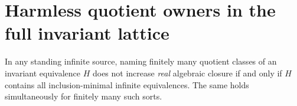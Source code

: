 \section{Harmless quotient owners in the full invariant lattice}
\label{sec:harmless-exact-owners}

\begin{lemma}
\label{lem:acf-harmless-owners}
In any standing infinite source, naming finitely many quotient
classes of an invariant equivalence $H$ does not increase
\emph{real} algebraic closure if and only if $H$ contains
all inclusion-minimal infinite equivalences.  The same holds
simultaneously for finitely many such sorts.
\end{lemma}
